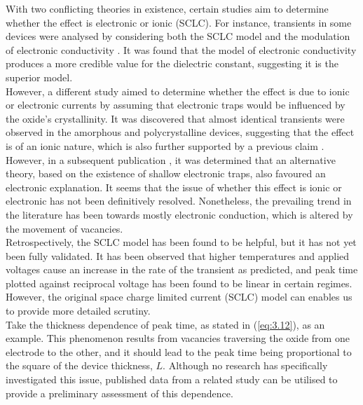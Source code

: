 \noindent With two conflicting theories in existence, certain studies aim to determine whether the effect is electronic or ionic (SCLC). For instance, transients in some devices were analysed by considering both the SCLC model and the modulation of electronic conductivity \cite{wakiya2006activation}. It was found that the model of electronic conductivity produces a more credible value for the dielectric constant, suggesting it is the superior model. \\

\noindent However, a different study \cite{el2006space} aimed to determine whether the effect is due to ionic or electronic currents by assuming that electronic traps would be influenced by the oxide's crystallinity. It was discovered that almost identical transients were observed in the amorphous and polycrystalline devices, suggesting that the effect is of an ionic nature, which is also further supported by a previous claim \cite{zafar1998oxygen}. \\

\noindent However, in a subsequent publication \cite{el2007ionic}, it was determined that an alternative theory, based on the existence of shallow electronic traps, also favoured an electronic explanation. It seems that the issue of whether this effect is ionic or electronic has not been definitively resolved. Nonetheless, the prevailing trend in the literature has been towards mostly electronic conduction, which is altered by the movement of vacancies.\\

\noindent Retrospectively, the SCLC model has been found to be helpful, but it has not yet been fully validated. It has been observed that higher temperatures and applied voltages cause an increase in the rate of the transient as predicted, and peak time plotted against reciprocal voltage has been found to be linear in certain regimes. However, the original space charge limited current (SCLC) model can enables us to provide more detailed scrutiny.\\

\noindent Take the thickness dependence of peak time, as stated in (\ref{eq:3.12}), as an example. This phenomenon results from vacancies traversing the oxide from one electrode to the other, and it should lead to the peak time being proportional to the square of the device thickness, $L$. Although no research has specifically investigated this issue, published data from a related study can be utilised to provide a preliminary assessment of this dependence.\\

